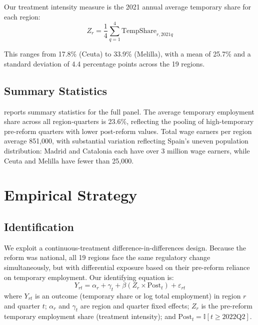 \documentclass[12pt]{article}
\newcommand{\ind}{\mathbb{I}}
\begin{document}
Our treatment intensity measure is the 2021 annual average temporary share for each region:
\begin{equation}
Z_r = \frac{1}{4} \sum_{q=1}^{4} \text{TempShare}_{r,2021q}
\end{equation}

This ranges from 17.8\% (Ceuta) to 33.9\% (Melilla), with a mean of 25.7\% and a standard deviation of 4.4 percentage points across the 19 regions.

\subsection{Summary Statistics}



 reports summary statistics for the full panel. The average temporary employment share across all region-quarters is 23.6\%, reflecting the pooling of high-temporary pre-reform quarters with lower post-reform values. Total wage earners per region average 851,000, with substantial variation reflecting Spain's uneven population distribution: Madrid and Catalonia each have over 3 million wage earners, while Ceuta and Melilla have fewer than 25,000.


\section{Empirical Strategy}
\label{sec:strategy}

\subsection{Identification}

We exploit a continuous-treatment difference-in-differences design. Because the reform was national, all 19 regions face the same regulatory change simultaneously, but with differential exposure based on their pre-reform reliance on temporary employment. Our identifying equation is:
\begin{equation}
Y_{rt} = \alpha_r + \gamma_t + \beta(Z_r \times \text{Post}_t) + \varepsilon_{rt}
\label{eq:main}
\end{equation}
where $Y_{rt}$ is an outcome (temporary share or log total employment) in region $r$ and quarter $t$; $\alpha_r$ and $\gamma_t$ are region and quarter fixed effects; $Z_r$ is the pre-reform temporary employment share (treatment intensity); and $\text{Post}_t = \ind[t \geq 2022\text{Q2}]$.
\end{document}
